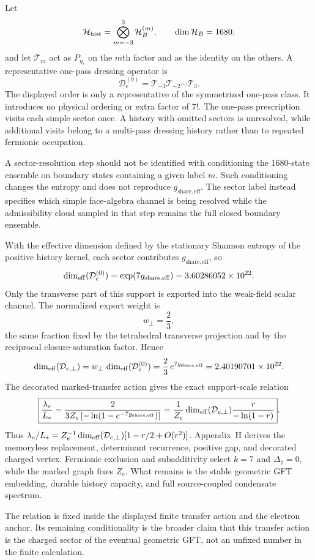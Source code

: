 \documentclass[11pt]{article}
\begin{document}
Let
\[
\mathcal H_{\rm hist}
=
\bigotimes_{m=-3}^{3}\mathcal H_B^{(m)},
\qquad
\dim \mathcal H_B=1680,
\]
and let $\mathcal T_m$ act as $P_{\eta_*}$ on the $m$th factor and as the identity on the others. A representative one-pass dressing operator is
\[
\mathcal D_e^{(0)}
=
\mathcal T_{-3}\mathcal T_{-2}\cdots\mathcal T_{3}.
\]
The displayed order is only a representative of the symmetrized one-pass class. It introduces no physical ordering or extra factor of $7!$. The one-pass prescription visits each simple sector once. A history with omitted sectors is unresolved, while additional visits belong to a multi-pass dressing history rather than to repeated fermionic occupation.

A sector-resolution step should not be identified with conditioning the
1680-state ensemble on boundary states containing a given label $m$.  Such
conditioning changes the entropy and does not reproduce
$g_{\mathrm{share,eff}}$.  The sector label instead specifies which simple
face-algebra channel is being resolved while the admissibility cloud sampled
in that step remains the full closed boundary ensemble.

With the effective dimension defined by the stationary Shannon entropy of the positive history kernel, each sector contributes $g_{\mathrm{share,eff}}$, so
\[
\dim_{\rm eff}(\mathcal D_e^{(0)})
=
\exp(7g_{\mathrm{share,eff}})
=
3.60286052\times10^{22}.
\]
Only the transverse part of this support is exported into the weak-field scalar channel. The normalized export weight is
\[
w_\perp=\frac23,
\]
the same fraction fixed by the tetrahedral transverse projection and by the reciprocal closure-saturation factor. Hence
\[
\dim_{\rm eff}(\mathcal D_{e,\perp})
=
w_\perp\,\dim_{\rm eff}(\mathcal D_e^{(0)})
=
\frac23\,e^{7g_{\mathrm{share,eff}}}
=
2.40190701\times10^{22}.
\]
The decorated marked-transfer action gives the exact support-scale relation
\[
\boxed{
\frac{\lambda_e}{L_*}
=
\frac{2}{3Z_e\left[-\ln\!\left(1-e^{-7g_{\mathrm{share,eff}}}\right)\right]}
=
\frac{1}{Z_e}\dim_{\rm eff}(\mathcal D_{e,\perp})
\frac{r}{-\ln(1-r)}
}.
\]
Thus $\lambda_e/L_*=Z_e^{-1}\dim_{\rm eff}(\mathcal D_{e,\perp})[1-r/2+O(r^2)]$. Appendix~H derives the memoryless replacement, determinant recurrence, positive gap, and decorated charged vertex. Fermionic exclusion and subadditivity select $k=7$ and $\Delta_7=0$, while the marked graph fixes $Z_e$. What remains is the stable geometric GFT embedding, durable history capacity, and full source-coupled condensate spectrum.

The relation is fixed inside the displayed finite transfer action and the electron anchor. Its remaining conditionality is the broader claim that this transfer action is the charged sector of the eventual geometric GFT, not an unfixed number in the finite calculation.
\end{document}
